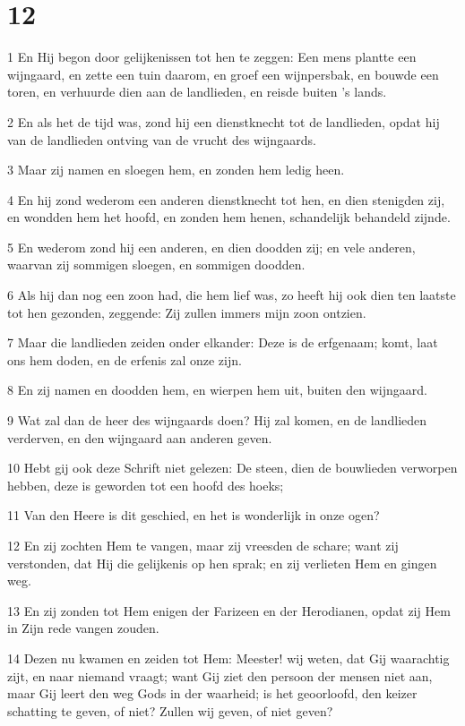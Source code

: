 \chapter{12}

\par 1 En Hij begon door gelijkenissen tot hen te zeggen: Een mens plantte een wijngaard, en zette een tuin daarom, en groef een wijnpersbak, en bouwde een toren, en verhuurde dien aan de landlieden, en reisde buiten 's lands.
\par 2 En als het de tijd was, zond hij een dienstknecht tot de landlieden, opdat hij van de landlieden ontving van de vrucht des wijngaards.
\par 3 Maar zij namen en sloegen hem, en zonden hem ledig heen.
\par 4 En hij zond wederom een anderen dienstknecht tot hen, en dien stenigden zij, en wondden hem het hoofd, en zonden hem henen, schandelijk behandeld zijnde.
\par 5 En wederom zond hij een anderen, en dien doodden zij; en vele anderen, waarvan zij sommigen sloegen, en sommigen doodden.
\par 6 Als hij dan nog een zoon had, die hem lief was, zo heeft hij ook dien ten laatste tot hen gezonden, zeggende: Zij zullen immers mijn zoon ontzien.
\par 7 Maar die landlieden zeiden onder elkander: Deze is de erfgenaam; komt, laat ons hem doden, en de erfenis zal onze zijn.
\par 8 En zij namen en doodden hem, en wierpen hem uit, buiten den wijngaard.
\par 9 Wat zal dan de heer des wijngaards doen? Hij zal komen, en de landlieden verderven, en den wijngaard aan anderen geven.
\par 10 Hebt gij ook deze Schrift niet gelezen: De steen, dien de bouwlieden verworpen hebben, deze is geworden tot een hoofd des hoeks;
\par 11 Van den Heere is dit geschied, en het is wonderlijk in onze ogen?
\par 12 En zij zochten Hem te vangen, maar zij vreesden de schare; want zij verstonden, dat Hij die gelijkenis op hen sprak; en zij verlieten Hem en gingen weg.
\par 13 En zij zonden tot Hem enigen der Farizeen en der Herodianen, opdat zij Hem in Zijn rede vangen zouden.
\par 14 Dezen nu kwamen en zeiden tot Hem: Meester! wij weten, dat Gij waarachtig zijt, en naar niemand vraagt; want Gij ziet den persoon der mensen niet aan, maar Gij leert den weg Gods in der waarheid; is het geoorloofd, den keizer schatting te geven, of niet? Zullen wij geven, of niet geven?
